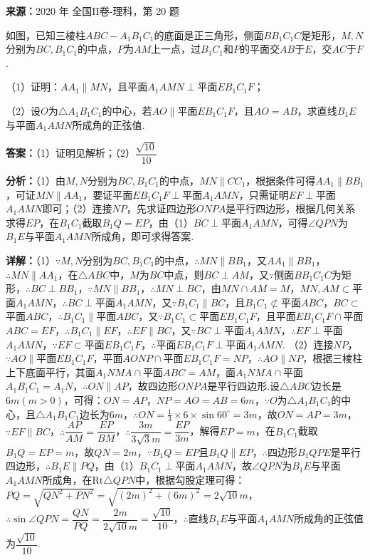 \begin{question}[points=12]
\textbf{来源：}2020 年 全国II卷-理科，第 20 题\par
如图，已知三棱柱$ABC-A_1B_1C_1$的底面是正三角形，侧面$BB_1C_1C$是矩形，$M,N$分别为$BC,B_1C_1$的中点，$P$为$AM$上一点，过$B_1C_1$和$P$的平面交$AB$于$E$，交$AC$于$F$.

（1）证明：$AA_1\parallel MN$，且平面$A_1AMN\perp$平面$EB_1C_1F$；

（2）设$O$为$\triangle A_1B_1C_1$的中心，若$AO\parallel$平面$EB_1C_1F$，且$AO=AB$，求直线$B_1E$与平面$A_1AMN$所成角的正弦值.
\begin{solution}
\textbf{答案：}（1）证明见解析；（2）$\dfrac{\sqrt{10}}{10}$

\textbf{分析：}（1）由$M,N$分别为$BC,B_1C_1$的中点，$MN\parallel CC_1$，根据条件可得$AA_1\parallel BB_1$，可证$MN\parallel AA_1$，要证平面$EB_1C_1F\perp$平面$A_1AMN$，只需证明$EF\perp$平面$A_1AMN$即可；（2）连接$NP$，先求证四边形$ONPA$是平行四边形，根据几何关系求得$EP$，在$B_1C_1$截取$B_1Q=EP$，由（1）$BC\perp$平面$A_1AMN$，可得$\angle QPN$为$B_1E$与平面$A_1AMN$所成角，即可求得答案.

\textbf{详解：}（1）$\because M,N$分别为$BC,B_1C_1$的中点，$\therefore MN\parallel BB_1$，又$AA_1\parallel BB_1$，$\therefore MN\parallel AA_1$，在$\triangle ABC$中，$M$为$BC$中点，则$BC\perp AM$，又$\because$侧面$BB_1C_1C$为矩形，$\therefore BC\perp BB_1$，$\because MN\parallel BB_1$，$\therefore MN\perp BC$，由$MN\cap AM=M$，$MN,AM\subset$平面$A_1AMN$，$\therefore BC\perp$平面$A_1AMN$，又$\because B_1C_1\parallel BC$，且$B_1C_1\not\subset$平面$ABC$，$BC\subset$平面$ABC$，$\therefore B_1C_1\parallel$平面$ABC$，又$\because B_1C_1\subset$平面$EB_1C_1F$，且平面$EB_1C_1F\cap$平面$ABC=EF$，$\therefore B_1C_1\parallel EF$，$\therefore EF\parallel BC$，又$\because BC\perp$平面$A_1AMN$，$\therefore EF\perp$平面$A_1AMN$，$\because EF\subset$平面$EB_1C_1F$，$\therefore$平面$EB_1C_1F\perp$平面$A_1AMN$.
（2）连接$NP$，$\because AO\parallel$平面$EB_1C_1F$，平面$AONP\cap$平面$EB_1C_1F=NP$，$\therefore AO\parallel NP$，根据三棱柱上下底面平行，其面$A_1NMA\cap$平面$ABC=AM$，面$A_1NMA\cap$平面$A_1B_1C_1=A_1N$，$\therefore ON\parallel AP$，故四边形$ONPA$是平行四边形.设$\triangle ABC$边长是$6m(m>0)$，可得：$ON=AP$，$NP=AO=AB=6m$，$\because O$为$\triangle A_1B_1C_1$的中心，且$\triangle A_1B_1C_1$边长为$6m$，$\therefore ON=\frac13\times6\times\sin60^\circ=3m$，故$ON=AP=3m$，$\because EF\parallel BC$，$\therefore\dfrac{AP}{AM}=\dfrac{EP}{BM}$，$\therefore\dfrac{3m}{3\sqrt3m}=\dfrac{EP}{3m}$，解得$EP=m$，在$B_1C_1$截取$B_1Q=EP=m$，故$QN=2m$，$\because B_1Q=EP$且$B_1Q\parallel EP$，$\therefore$四边形$B_1QPE$是平行四边形，$\therefore B_1E\parallel PQ$，由（1）$B_1C_1\perp$平面$A_1AMN$，故$\angle QPN$为$B_1E$与平面$A_1AMN$所成角，在$\text{Rt}\triangle QPN$中，根据勾股定理可得：$PQ=\sqrt{QN^2+PN^2}=\sqrt{(2m)^2+(6m)^2}=2\sqrt{10}m$，$\therefore\sin\angle QPN=\dfrac{QN}{PQ}=\dfrac{2m}{2\sqrt{10}m}=\dfrac{\sqrt{10}}{10}$，$\therefore$直线$B_1E$与平面$A_1AMN$所成角的正弦值为$\dfrac{\sqrt{10}}{10}$.
\end{solution}
\end{question}

